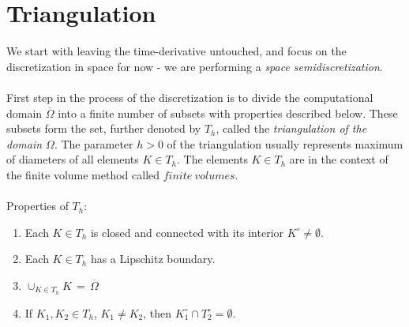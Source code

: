 \section{Triangulation}
\label{section:triangulation}
We start with leaving the time-derivative untouched, and focus on the discretization in space for now - we are performing a \textit{space semidiscretization}.
\paragraph{}
First step in the process of the discretization is to divide the computational domain $\overline{\Omega}$ into a finite number of subsets with properties described below. These subsets form the set, further denoted by $ T_h$, called the \textit{triangulation of the domain $\Omega$}. The parameter $h>0$ of the triangulation usually represents maximum of diameters of all elements $K\in T_h$. The elements $K\in T_h$ are in the context of the finite volume method called $finite\ volumes$.
\\\ \\Properties of $ T_h$:
\begin{enumerate}
    \item Each $K\in T_h$ is closed and connected with its interior $K^{\circ}\neq\emptyset$.
    \item Each $K\in T_h$ has a Lipschitz boundary.
    \item$\cup_{K\in T_h}K\,=\,\overline{\Omega}$
    \item If $K_1,K_2\in T_h$, $K_1\neq{K_2}$, then $K_1^{\circ}\cap{T}_2^{\circ} = \emptyset$.
\end{enumerate}
